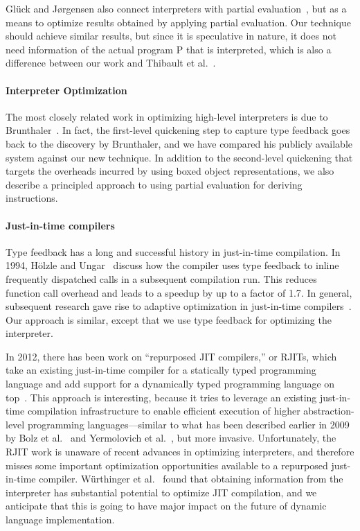 \documentclass[preprint,10pt]{popl14conf}
\begin{document}
Gl{\"u}ck and J{\o}rgensen also connect interpreters with partial
evaluation~\cite{gluck.jorgensen+94}, but as a means to optimize results obtained by applying
partial evaluation.
Our technique should achieve similar results, but since it is speculative in nature, it does not
need information of the actual program P that is interpreted, which is also a difference between our
work and Thibault et al.~\cite{thibault.etal+00}.

\paragraph{Interpreter Optimization}
The most closely related work in optimizing high-level interpreters is due to
Brunthaler~\cite{brunthaler+10a,brunthaler+10b}.
In fact, the first-level quickening step to capture type feedback goes back to the discovery by
Brunthaler, and we have compared his publicly available system against our new technique.
In addition to the second-level quickening that targets the overheads incurred by using boxed object
representations, we also describe a principled approach to using partial evaluation for deriving
instructions.

\paragraph{Just-in-time compilers}
Type feedback has a long and successful history in just-in-time compilation.
In 1994, H\"{o}lzle and Ungar~\cite{holzle.ungar+94,holzle+94} discuss how the compiler uses type
feedback to inline frequently dispatched calls in a subsequent compilation run.
This reduces function call overhead and leads to a speedup by up to a factor of 1.7.
In general, subsequent research gave rise to adaptive optimization in just-in-time
compilers~\cite{aycock+03}.
Our approach is similar, except that we use type feedback for optimizing the interpreter.

In 2012, there has been work on ``repurposed JIT compilers,'' or RJITs, which take an existing
just-in-time compiler for a statically typed programming language and add support for a dynamically
typed programming language on top~\cite{ishizaki.etal+12,castanos.etal+12}.
This approach is interesting, because it tries to leverage an existing just-in-time compilation
infrastructure to enable efficient execution of higher abstraction-level programming
languages---similar to what has been described earlier in 2009 by Bolz et
al.~\cite{bolz.etal+09} and Yermolovich et al.~\cite{yermolovich.etal+09}, but more
invasive.
Unfortunately, the RJIT work is unaware of recent advances in optimizing interpreters, and therefore
misses some important optimization opportunities available to a repurposed just-in-time compiler.
W\"{u}rthinger et al.~\cite{wurthinger.etal+12} found that obtaining information from the
interpreter has substantial potential to optimize JIT compilation, and we anticipate that this is
going to have major impact on the future of dynamic language implementation.
\end{document}
